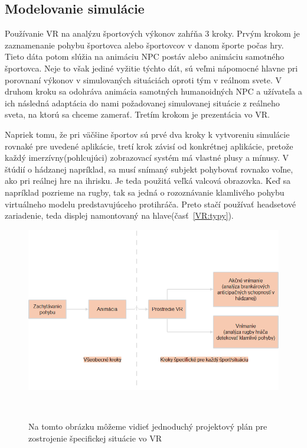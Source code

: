 \documentclass[10pt,twoside,slovak,a4paper]{article}										%
\begin{document}
\subsection{Modelovanie simulácie} \label{SW:model}
Používanie VR na analýzu športových výkonov zahŕňa 3 kroky. Prvým krokom je zaznamenanie pohybu športovca alebo športovcov v danom športe počas hry. Tieto dáta potom slúžia na animáciu NPC postáv alebo animáciu samotného športovca. Neje to však jediné vyžitie týchto dát, sú veľmi nápomocné hlavne pri porovnaní výkonov v simulovaných situáciách oproti tým v reálnom svete. V druhom kroku sa odohráva animácia samotných humanoidných NPC a užívateľa a ich následná adaptácia do nami požadovanej simulovanej situácie z reálneho sveta, na ktorú sa chceme zamerať. Tretím krokom je prezentácia vo VR.

Napriek tomu, že pri väčšine športov sú prvé dva kroky k vytvoreniu simulácie rovnaké pre uvedené aplikácie, tretí krok závisí od konkrétnej aplikácie, pretože každý imerzívny(pohlcujúci) zobrazovací systém má vlastné plusy a mínusy. V štúdií o hádzanej napríklad, sa musí snímaný subjekt pohybovať rovnako voľne, ako pri reálnej hre na ihrisku. Je teda použitá veľká valcová obrazovka. Keď sa napríklad pozrieme na rugby, tak sa jedná o rozoznávanie klamlivého pohybu virtuálneho modelu predstavujúceho protihráča. Preto stačí používať headsetové zariadenie, teda displej namontovaný na hlave(časť~\ref{VR:typy}). ~\cite{Hlavny:zdroj}
\clearpage
\begin{figure}[htbp]
\centering
\includegraphics[scale=0.4]{model.png}
\caption{Na tomto obrázku môžeme vidieť jednoduchý projektový plán pre zostrojenie špecifickej situácie vo VR}  ~\cite{Hlavny:zdroj}
\label{fig}
\end{figure}
\end{document}
